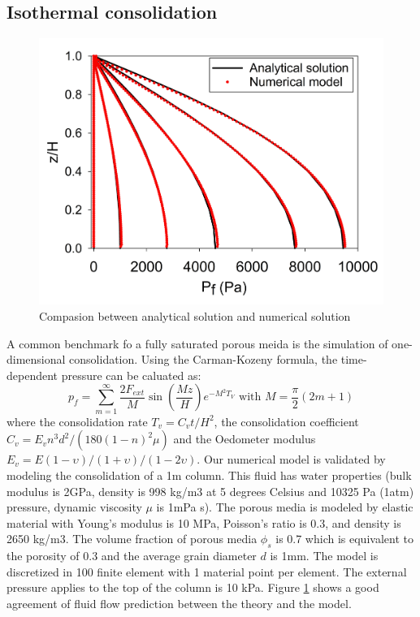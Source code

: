 \documentclass[preprint,12pt]{elsarticle}
\begin{document}
\subsection{\textsf{Isothermal consolidation}}
%
%
\begin{figure}[h]
\center
\includegraphics[scale=.3]{consolidation.jpg}
\caption{Compasion between analytical solution and numerical solution}
\label{fig:consolidation}
\end{figure}
%
%
A common benchmark fo a fully saturated porous meida is the simulation of one-dimensional consolidation. Using the Carman-Kozeny formula, the time-dependent pressure can be caluated as:
%
%
\begin{equation}
  p_f  = \sum_{m=1}^{\infty} \frac{2F_{ext}}{M} \sin (\frac{Mz}{H}) e^{-M^2T_V} \textrm{    with    }   M = \frac{\pi}{2} (2m+1)
\end{equation}
%
%
where the consolidation rate $T_v =C_vt/H^2$, the consolidation coefficient $C_v = E_v n^3 d^2/(180(1-n)^2\mu) $ and the Oedometer modulus $E_v = E(1-\upsilon)/(1+\upsilon)/(1-2\upsilon)$.
Our numerical model is validated by modeling the consolidation of a 1m column. This fluid has water properties (bulk modulus is 2GPa, density is 998 kg/m3 at 5 degrees Celsius and 10325 Pa (1atm) pressure, dynamic viscosity $\mu$ is 1mPa s). The porous media is modeled by elastic material with Young's modulus is 10 MPa, Poisson's ratio is 0.3, and density is 2650 kg/m3. The volume fraction of porous media $\phi_s$ is 0.7 which is equivalent to the porosity of 0.3 and the average grain diameter $d$ is 1mm. The model is discretized in 100 finite element with 1 material point per element. The external pressure applies to the top of the column is 10 kPa. Figure \ref{fig:consolidation} shows a good agreement of fluid flow prediction between the theory and the model. \\
\end{document}
